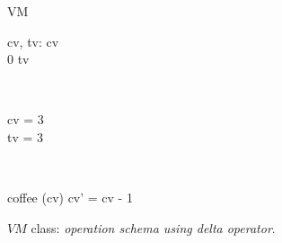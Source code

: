 \begin{figure}[H]
\centering
\begin{class}{VM}
\\
\begin{state}
cv, tv: \integer
{} \leq  cv 
\\
0 \leq  tv 
\end{state} 
\\
\begin{init}
cv = 3
\\tv = 3
\end{init} 
\\
\begin{op}{coffee}
\Delta (cv)
\ST
cv' = cv - 1
\end{op}
\end{class}
\caption{$VM$ class: \textit{operation schema using delta operator}.}
\label{oz_vm_op_schema_delta}
\end{figure}